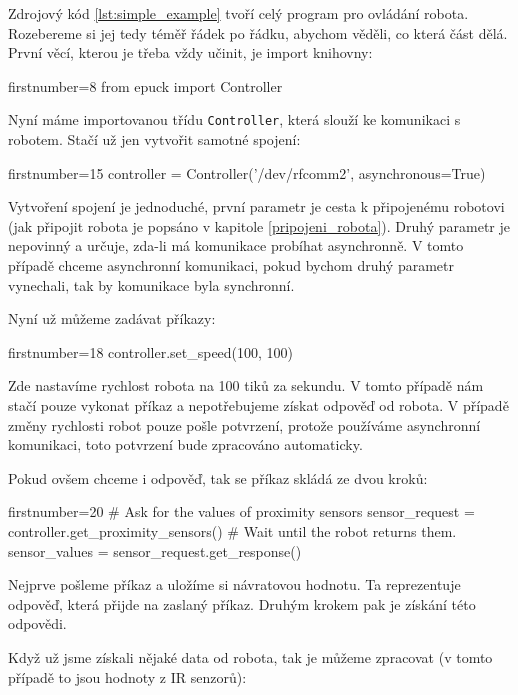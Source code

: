 \documentclass[12pt,notitlepage]{report}
\begin{document}
    Zdrojový kód \ref{lst:simple_example} tvoří celý program pro ovládání
    robota. Rozebereme si jej tedy téměř řádek po řádku, abychom věděli, co
    která část dělá. První věcí, kterou je třeba vždy učinit, je import
    knihovny:

    \begin{pyc*}{firstnumber=8}
from epuck import Controller
    \end{pyc*}

    Nyní máme importovanou třídu {\tt Controller}, která slouží ke komunikaci s
    robotem. Stačí už jen vytvořit samotné spojení:

    \begin{pyc*}{firstnumber=15}
controller = Controller('/dev/rfcomm2', asynchronous=True)
    \end{pyc*}

    Vytvoření spojení je jednoduché, první parametr je cesta k připojenému
    robotovi (jak připojit robota je popsáno v kapitole
    \ref{pripojeni_robota}). Druhý parametr je nepovinný a určuje, zda-li má
    komunikace probíhat asynchronně. V tomto případě chceme asynchronní
    komunikaci, pokud bychom druhý parametr vynechali, tak by komunikace byla
    synchronní.

    Nyní už můžeme zadávat příkazy:

    \begin{pyc*}{firstnumber=18}
controller.set_speed(100, 100)
    \end{pyc*}

    Zde nastavíme rychlost robota na 100 tiků za sekundu. V tomto případě nám
    stačí pouze vykonat příkaz a nepotřebujeme získat odpověď od robota. V
    případě změny rychlosti robot pouze pošle potvrzení, protože používáme
    asynchronní komunikaci, toto potvrzení bude zpracováno automaticky.

    Pokud ovšem chceme i odpověď, tak se příkaz skládá ze dvou kroků:

    \begin{pyc*}{firstnumber=20}
# Ask for the values of proximity sensors
sensor_request = controller.get_proximity_sensors()
# Wait until the robot returns them.
sensor_values = sensor_request.get_response()
    \end{pyc*}

    Nejprve pošleme příkaz a uložíme si návratovou hodnotu. Ta reprezentuje
    odpověď, která přijde na zaslaný příkaz. Druhým krokem pak je získání této
    odpovědi.

    Když už jsme získali nějaké data od robota, tak je můžeme zpracovat (v
    tomto případě to jsou hodnoty z IR senzorů):
\end{document}
